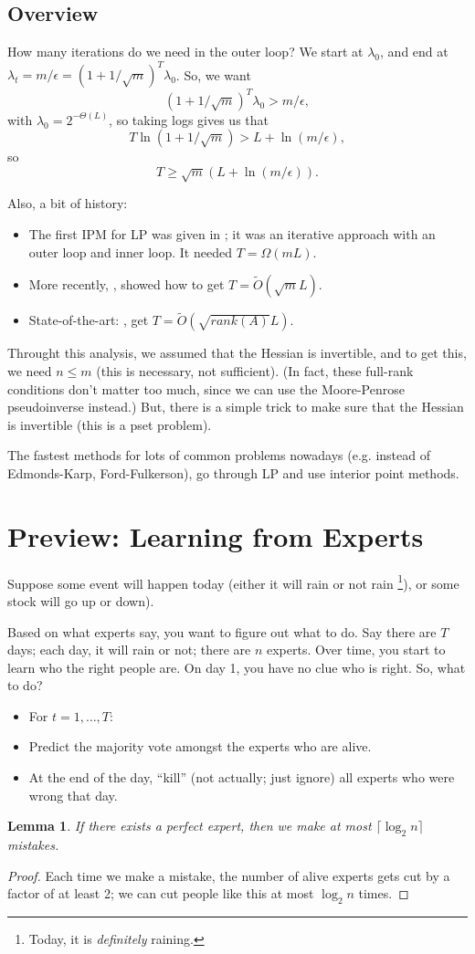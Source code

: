 \documentclass[11pt]{article}
\newtheorem{lemma}[theorem]{Lemma}
\newcommand{\ep}{\epsilon}
\begin{document}
\subsection{Overview}
How many iterations do we need in the outer loop? We start at $\lambda_0$, and end at $\lambda_t = m/\ep = (1+1/\sqrt m)^T \lambda_0$. So, we want
$$
(1+1/\sqrt m)^T \lambda_0 > m/\ep,
$$
with $\lambda_0 = 2^{-\Theta(L)}$, so taking logs gives us that
$$
T \ln(1+1/\sqrt m) > L + \ln(m/\ep),
$$
so
$$
T \geq \sqrt m(L + \ln(m/\ep)).
$$

Also, a bit of history: 
\begin{itemize}
\item The first IPM for LP was given in \cite{karmarkar_new_1984}; it was an iterative approach with an outer loop and inner loop. It needed $T = \Omega(mL)$. 
\item More recently, \cite{renegar_polynomial-time_1988}, showed how to get $T = \tilde O(\sqrt mL)$. 
\item State-of-the-art: \cite{lee_path_2014}, get $T = \tilde O(\sqrt{rank(A)} L)$. 
\end{itemize}
Throught this analysis, we assumed that the Hessian is invertible, and to get this, we need $n \leq m$ (this is necessary, not sufficient). (In fact, these full-rank conditions don't matter too much, since we can use the Moore-Penrose pseudoinverse instead.) But, there is a simple trick to make sure that the Hessian is invertible (this is a pset problem).

The fastest methods for lots of common problems nowadays (e.g. instead of Edmonds-Karp, Ford-Fulkerson), go through LP and use interior point methods.

\section{Preview: Learning from Experts}
Suppose some event will happen today (either it will rain or not rain \footnote{Today, it is {\it definitely} raining.}), or some stock will go up or down). 

Based on what experts say, you want to figure out what to do. Say there are $T$ days; each day, it will rain or not; there are $n$ experts. Over time, you start to learn who the right people are. On day 1, you have no clue who is right. So, what to do?
\begin{itemize}
\item For $t = 1, \ldots, T$:
\item Predict the majority vote amongst the experts who are alive.
\item At the end of the day, ``kill'' (not actually; just ignore) all experts who were wrong that day.
\end{itemize}
\begin{lemma}
If there exists a perfect expert, then we make at most $\lceil \log_2 n \rceil$ mistakes.
\end{lemma}
\begin{proof}
Each time we make a mistake, the number of alive experts gets cut by a factor of at least 2; we can cut people like this at most $\log_2n$ times.
\end{proof}
\end{document}
